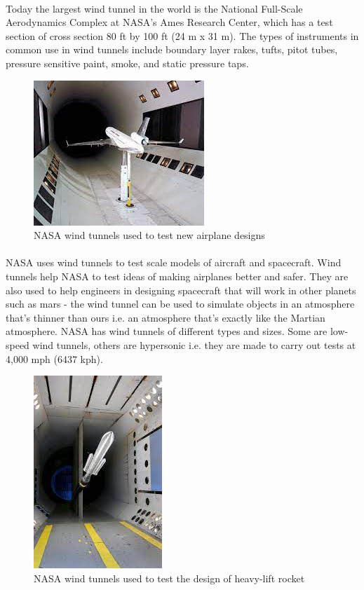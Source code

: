 \paragraph{}Today the largest wind tunnel in the world is the National Full-Scale Aerodynamics Complex at NASA's Ames Research Center, which has a test section of cross section 80 ft by 100 ft (24 m x 31 m). The types of instruments in common use in wind tunnels include boundary layer rakes, tufts, pitot tubes, pressure sensitive paint, smoke, and static pressure taps.
\begin{center}
\begin{figure}[!h]
	\centering
	\includegraphics{Figures/Fig3}
	\caption{NASA wind tunnels used to test new airplane designs}
\end{figure}
\end{center}
\paragraph{}NASA uses wind tunnels to test scale models of aircraft and spacecraft. Wind tunnels help NASA to test ideas of making airplanes better and safer. They are also used to help engineers in designing spacecraft that will work in other planets such as mars - the wind tunnel can be used to simulate objects in an atmosphere that's thinner than ours i.e. an atmosphere that's exactly like the Martian atmosphere. NASA has wind tunnels of different types and sizes. Some are low-speed wind tunnels, others are hypersonic i.e. they are made to carry out tests at 4,000 mph (6437 kph).
\begin{center}
    \begin{figure}[!h]
\centering
\includegraphics{Figures/Fig4}
\caption{NASA wind tunnels used to test the design of heavy-lift rocket}
\end{figure}
\end{center}
